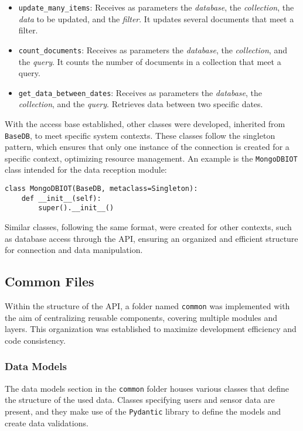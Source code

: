 \begin{itemize}
    \item \texttt{update\_many\_items}: Receives as parameters the \textit{database}, the \textit{collection}, the \textit{data} to be updated, and the \textit{filter}. It updates several documents that meet a filter.
    
    \item \texttt{count\_documents}: Receives as parameters the \textit{database}, the \textit{collection}, and the \textit{query}. It counts the number of documents in a collection that meet a query.
    
    \item \texttt{get\_data\_between\_dates}: Receives as parameters the \textit{database}, the \textit{collection}, and the \textit{query}. Retrieves data between two specific dates.
\end{itemize}

With the access base established, other classes were developed, inherited from \texttt{BaseDB}, to meet specific system contexts. These classes follow the singleton pattern, which ensures that only one instance of the connection is created for a specific context, optimizing resource management. An example is the \texttt{MongoDBIOT} class intended for the data reception module:

\begin{verbatim}
class MongoDBIOT(BaseDB, metaclass=Singleton):
    def __init__(self):
        super().__init__()
\end{verbatim}

Similar classes, following the same format, were created for other contexts, such as database access through the \gls{API}, ensuring an organized and efficient structure for connection and data manipulation.

\subsection{Common Files}\label{subsec:commum}

Within the structure of the \gls{API}, a folder named \texttt{common} was implemented with the aim of centralizing reusable components, covering multiple modules and layers. This organization was established to maximize development efficiency and code consistency.

\subsubsection{Data Models}\label{subsubsec:dataModel}
The data models section in the \texttt{common} folder houses various classes that define the structure of the used data. Classes specifying users and sensor data are present, and they make use of the \texttt{Pydantic} library to define the models and create data validations.

